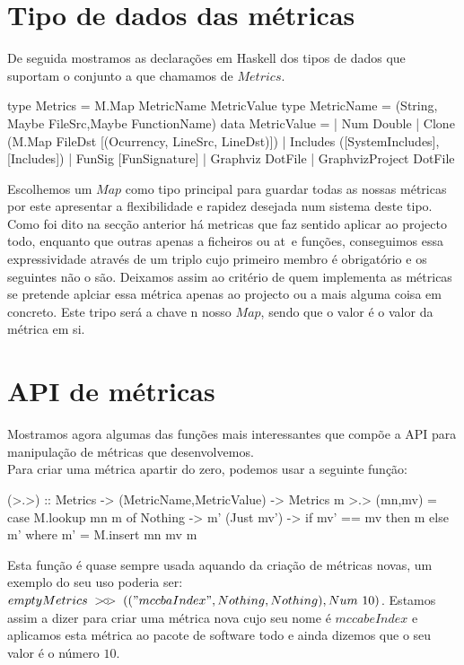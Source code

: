 \section{Tipo de dados das métricas}
De seguida mostramos as declarações em Haskell dos tipos de dados
que suportam o conjunto a que chamamos de $Metrics$.

\begin{haskell}
type Metrics = M.Map MetricName MetricValue
type MetricName = (String, Maybe FileSrc,Maybe FunctionName)
data MetricValue =
    | Num Double
    | Clone (M.Map FileDst [(Ocurrency, LineSrc, LineDst)])
    | Includes ([SystemIncludes],[Includes])
    | FunSig [FunSignature]
    | Graphviz DotFile
    | GraphvizProject DotFile																				 
\end{haskell}

Escolhemos um $Map$ como tipo principal para guardar todas as nossas
métricas por este apresentar a flexibilidade e rapidez desejada num sistema
deste tipo.\\
Como foi dito na secção anterior há metricas que faz sentido aplicar ao projecto
todo, enquanto que outras apenas a ficheiros ou at~e funções, conseguimos
essa expressividade através de um triplo cujo primeiro membro
é obrigatório e os seguintes não o são. Deixamos assim ao critério de
quem implementa as métricas se pretende aplciar essa métrica apenas ao projecto ou
a mais alguma coisa em concreto.
Este tripo será a chave n nosso $Map$, sendo que o valor é o valor da métrica
em si.

\section{API de métricas}
Mostramos agora algumas das funções mais interessantes que compõe a API
para manipulação de métricas que desenvolvemos.\\

Para criar uma métrica apartir do zero, podemos usar a seguinte função:
\begin{haskell}
(>.>) :: Metrics -> (MetricName,MetricValue) -> Metrics
m >.> (mn,mv) = 
    case M.lookup mn m of
        Nothing    -> m'
        (Just mv') -> if mv' == mv then m else m'
    where m' = M.insert mn mv m
\end{haskell}
Esta função é quase sempre usada aquando da criação de métricas novas, um
exemplo do seu uso poderia ser:
$emptyMetrics~\mathbin{>\mkern-7mu\circ\mkern-9mu>}~(("mccbaIndex",Nothing,Nothing), Num~10)$.
Estamos assim a dizer para criar uma métrica nova cujo seu nome é
$mccabeIndex$ e aplicamos esta métrica ao pacote de software todo e ainda
dizemos que o seu valor é o número $10$.\\

